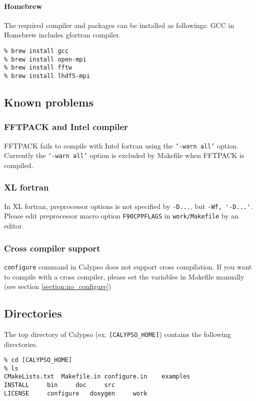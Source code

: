 \paragraph{Homebrew}
The required compiler and packages can be installed as followings: GCC in Homebrew includes gfortran compiler.
%
\begin{verbatim}
% brew install gcc
% brew install open-mpi
% brew install fftw
% brew install lhdf5-mpi
\end{verbatim}


\subsection{Known problems}
\subsubsection*{FFTPACK and Intel compiler}
FFTPACK fails to compile with Intel fortran using the {\tt `-warn all'} option. Currently the {\tt `-warn all'} option is excluded by Makefile when FFTPACK is compiled.

\subsubsection*{XL fortran}
In XL fortran, preprocessor options is not specified by \verb|-D...|, but \verb|-Wf, '-D...'|. Please edit preprocessor macro option \verb|F90CPPFLAGS| in \verb|work/Makefile| by an editor.

\subsubsection*{Cross compiler support}
{\tt configure} command in Calypso does not support cross compilation. If you want to compile with a cross compiler, please set the variables in Makefile manually (see section \ref{section:no_configure})

\subsection{Directories}

The top directory of Calypso (ex. \verb|[CALYPSO_HOME]|) contains the following directories.
\begin{verbatim}
% cd [CALYPSO_HOME]
% ls
CMakeLists.txt	Makefile.in	configure.in	examples
INSTALL		bin		doc		src
LICENSE		configure	doxygen		work

\end{verbatim}

